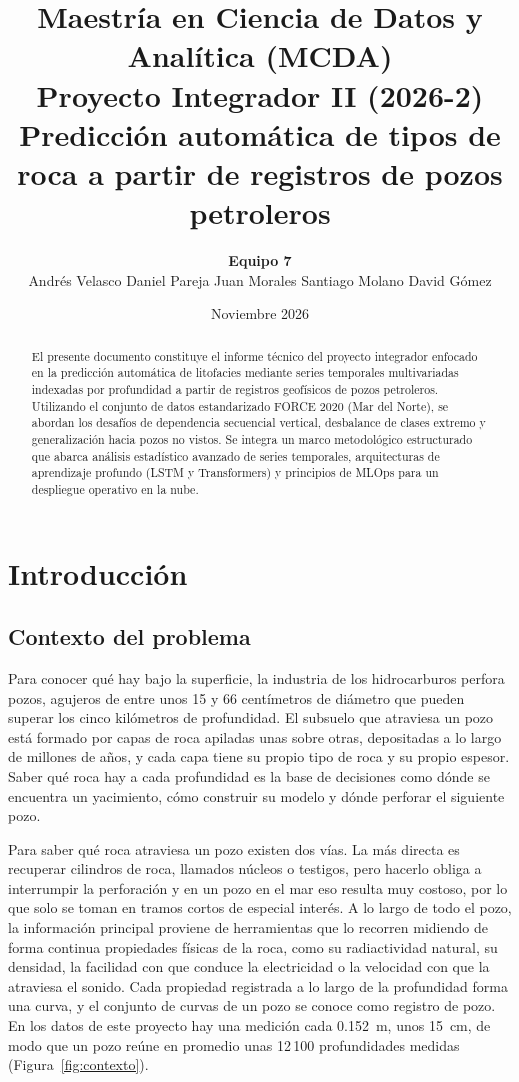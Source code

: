 \documentclass[11pt,a4paper]{article}
\title{\textbf{\Large Maestría en Ciencia de Datos y Analítica (MCDA)}\\[0.3em]
\Large Proyecto Integrador II (2026-2)\\[1.5em]
\huge Predicción automática de tipos de roca a partir de registros de pozos petroleros}
\author{\textbf{Equipo 7}\\[0.5em]
Andrés Velasco \quad Daniel Pareja \quad Juan Morales \quad Santiago Molano \quad David Gómez}
\date{Noviembre 2026}
\begin{document}
\maketitle

\begin{abstract}
\noindent El presente documento constituye el informe técnico del proyecto integrador enfocado en la predicción automática de litofacies mediante series temporales multivariadas indexadas por profundidad a partir de registros geofísicos de pozos petroleros. Utilizando el conjunto de datos estandarizado FORCE 2020 (Mar del Norte), se abordan los desafíos de dependencia secuencial vertical, desbalance de clases extremo y generalización hacia pozos no vistos. Se integra un marco metodológico estructurado que abarca análisis estadístico avanzado de series temporales, arquitecturas de aprendizaje profundo (LSTM y Transformers) y principios de MLOps para un despliegue operativo en la nube.
\end{abstract}

\tableofcontents
\newpage

\section{Introducción}

\subsection{Contexto del problema}

Para conocer qué hay bajo la superficie, la industria de los hidrocarburos perfora pozos, agujeros de entre unos 15 y 66 centímetros de diámetro que pueden superar los cinco kilómetros de profundidad. El subsuelo que atraviesa un pozo está formado por capas de roca apiladas unas sobre otras, depositadas a lo largo de millones de años, y cada capa tiene su propio tipo de roca y su propio espesor. Saber qué roca hay a cada profundidad es la base de decisiones como dónde se encuentra un yacimiento, cómo construir su modelo y dónde perforar el siguiente pozo.

Para saber qué roca atraviesa un pozo existen dos vías. La más directa es recuperar cilindros de roca, llamados núcleos o testigos, pero hacerlo obliga a interrumpir la perforación y en un pozo en el mar eso resulta muy costoso, por lo que solo se toman en tramos cortos de especial interés. A lo largo de todo el pozo, la información principal proviene de herramientas que lo recorren midiendo de forma continua propiedades físicas de la roca, como su radiactividad natural, su densidad, la facilidad con que conduce la electricidad o la velocidad con que la atraviesa el sonido. Cada propiedad registrada a lo largo de la profundidad forma una curva, y el conjunto de curvas de un pozo se conoce como registro de pozo. En los datos de este proyecto hay una medición cada 0.152~m, unos 15~cm, de modo que un pozo reúne en promedio unas 12\,100 profundidades medidas (Figura~\ref{fig:contexto}).
\end{document}
